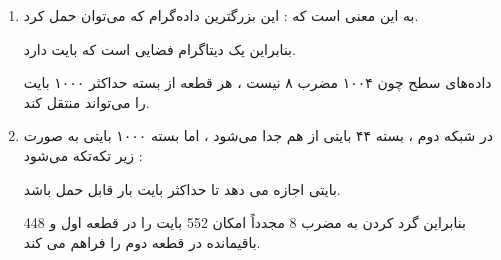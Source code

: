\begin{boxK}
    \begin{enumerate}
        \item 
    به این معنی است که :
    این بزرگترین داده‌گرام 
    که می‌توان حمل کرد.

    بنابراین یک دیتاگرام فضایی است که 
    بایت دارد.

    داده‌های سطح 
    چون ۱۰۰۴ مضرب ۸ نیست ، 
    هر قطعه از بسته حداکثر ۱۰۰۰ بایت را می‌تواند منتقل کند.


    \item 

        
    در شبکه دوم ، بسته ۴۴ بایتی از هم جدا می‌شود ، اما بسته ۱۰۰۰ بایتی به صورت زیر تکه‌تکه می‌شود : 

    بایتی اجازه می دهد تا حداکثر 
    بایت بار قابل حمل باشد.

    بنابراین گرد کردن به مضرب 8 مجدداً امکان 552 بایت را در قطعه اول و 448 باقیمانده در قطعه دوم را فراهم می کند.
    
    \end{enumerate}
\end{boxK}